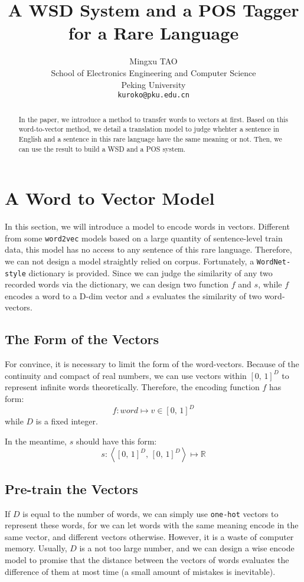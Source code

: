 \documentclass[11pt,a4paper]{article}
\title{A WSD System and a POS Tagger for a Rare Language}
\author{Mingxu TAO \\
  School of Electronics Engineering and Computer Science \\
  Peking University \\
  \texttt{kuroko@pku.edu.cn} }
\date{}
\begin{document}
\maketitle

\begin{abstract}
In the paper, we introduce a method to transfer words to vectors at first. Based on 
this word-to-vector method, we detail a translation model to judge whehter a sentence in 
English and a sentence in this rare language have the same meaning or not. Then, we can 
use the result to build a WSD and a POS system.
\end{abstract}


\section{A Word to Vector Model}

In this section, we will introduce a model to encode words in vectors. 
Different from some \texttt{word2vec} models based on a large quantity of 
sentence-level train data, this model has no access to any sentence of 
this rare language. Therefore, we can not design a model straightly relied 
on corpus. Fortunately, a \texttt{WordNet-style} dictionary is provided. 
Since we can judge the similarity of any two recorded words via the dictionary, 
we can design two function $f$ and $s$, while $f$ encodes a word to a D-dim 
vector and $s$ evaluates the similarity of two word-vectors. 

\subsection{The Form of the Vectors}

For convince, it is necessary to limit the form of the word-vectors. Because 
of the continuity and compact of real numbers, we can use vectors within $[0,\,1]^{D}$ 
to represent infinite words theoretically. Therefore, the encoding function $f$ has form:
$$f: word\mapsto v\in [0,\,1]^{D}$$
while $D$ is a fixed integer.

In the meantime, $s$ should have this form:
$$s: \left \langle [0,\,1]^{D},\,[0,\,1]^{D}\right\rangle \mapsto \mathbb{R}$$

\subsection{Pre-train the Vectors}

If $D$ is equal to the number of words, we can simply use \texttt{one-hot} vectors 
to represent these words, for we can let words with the same meaning encode in the 
same vector, and different vectors otherwise. However, it is a waste of computer memory.
Usually, $D$ is a not too large number, and we can design a wise encode model to promise 
that the distance between the vectors of words evaluates the difference of them at most time
(a small amount of mistakes is inevitable). 
\end{document}

